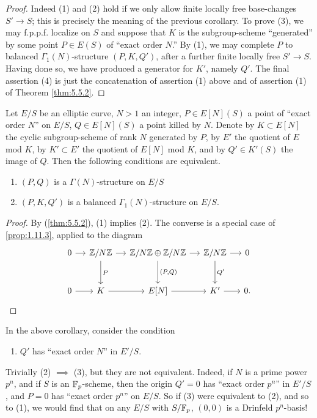 \begin{proof}
Indeed (1) and (2) hold if we only allow finite locally free base-changes $S' \to S$; this is precisely the meaning of the previous corollary. To prove (3), we may f.p.p.f. localize on $S$ and suppose that $K$ is the subgroup-scheme ``generated'' by some point $P \in E(S)$ of ``exact order $N$.'' By (1), we may complete $P$ to balanced $\Gamma_1(N)$-structure $(P, K, Q')$, after a further finite locally free $S' \to S$. Having done so, we have produced a generator for $K'$, namely $Q'$. The final assertion (4) is just the concatenation of assertion (1) above and of assertion (1) of Theorem \ref{thm:5.5.2}.
\end{proof}

\begin{kcor}\label{cor:5.5.5}
Let $E/S$ be an elliptic curve, $N > 1$ an integer, $P \in E[N](S)$ a point of ``exact order $N$'' on $E/S$, $Q \in E[N](S)$ a point killed by $N$. Denote by $K \subset E[N]$ the cyclic subgroup-scheme of rank $N$ generated by $P$, by $E'$ the quotient of $E$ mod $K$, by $K' \subset E'$ the quotient of $E[N]$ mod $K$, and by $Q' \in K'(S)$ the image of $Q$. Then the following conditions are equivalent.
\begin{enumerate}[(1)]
\item $(P, Q)$ is a $\Gamma(N)$-structure on $E/S$
\item $(P, K, Q')$ is a balanced $\Gamma_1(N)$-structure on $E/S$.
\end{enumerate}
\end{kcor}

\begin{proof}
By (\ref{thm:5.5.2}), (1) implies (2). The converse is a special case of \ref{prop:1.11.3}, applied to the diagram
\[
\begin{tikzcd}[row sep=large, column sep=small]
0 \arrow[r] & \Z/N\Z \arrow[r] \arrow[d, "P"] & \Z/N\Z \oplus \Z/N\Z \arrow[r] \arrow[d, "{(P, Q)}"] & \Z/N\Z \arrow[r] \arrow[d, "Q'"] & 0 \\
0 \arrow[r] & K \arrow[r] & E[N] \arrow[r] & K' \arrow[r] & 0.
\end{tikzcd}
\]
\end{proof}

\begin{kcaut}\label{caut:5.5.6}
In the above corollary, consider the condition
\begin{enumerate}[(3)]
\item $Q'$ has ``exact order $N$'' in $E'/S$.
\end{enumerate}
Trivially (2) $\implies$ (3), but they are not equivalent. Indeed, if $N$ is a prime power $p^n$, and if $S$ is an $\mathbb{F}_p$-scheme, then the origin $Q' = 0$ has ``exact order $p^n$'' in $E'/S$, and $P = 0$ has ``exact order $p^n$'' on $E/S$. So if (3) were equivalent to (2), and so to (1), we would find that on any $E/S$ with $S/\mathbb{F}_p$, $(0,0)$ is a Drinfeld $p^n$-basis!
\end{kcaut}

